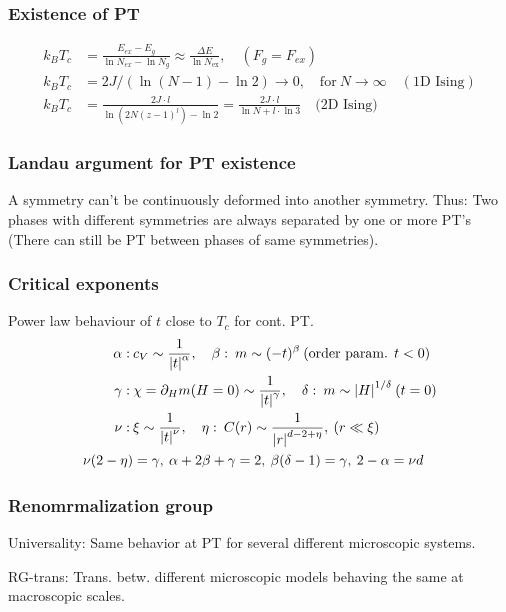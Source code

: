 \documentclass[a4paper, english, 12pt]{article}
\begin{document}
\begin{multicols*}{2}
\subsubsection*{\tiny Existence of PT} 

\begin{align*}
    k_B T_c &= \frac{E_{ex}-E_g}{\ln N_{ex}-\ln N_g} \approx \frac{\Delta E}{\ln N_\mathrm{ex}},\quad (F_g=F_{ex}) \\
    k_B T_c &= 2J/(\ln(N-1)-\ln 2) \to 0,\quad\text{for}\: N\to\infty\quad(\text{1D Ising}) \\
    k_B T_c &= \frac{2J\cdot l}{\ln(2N(z-1)^l)-\ln2} = \frac{2J \cdot l}{\ln N + l\cdot \ln3}\quad \text{(2D Ising)}
\end{align*} 


\subsubsection*{\tiny Landau argument for PT existence}
A symmetry can't be continuously deformed into another symmetry. Thus: Two phases with different symmetries are always separated by one or more PT's (There can still be PT between phases of same symmetries).


\subsubsection*{\scriptsize Critical exponents}
Power law behaviour of $t$ close to $T_c$ for cont. PT.
\begin{align*}
    \alpha:\: & c_V \sim \frac{1}{\abs{t}^\alpha},\quad \beta:\: m \sim (-t)^\beta\:(\text{order param. } t<0) \\ 
    \gamma:\:& \chi=\partial_H m(H=0) \sim \frac{1}{\abs{t}^\gamma},\quad \delta:\: m \sim \abs{H}^{1/\delta}\: (t=0) \\
    \nu:\: & \xi \sim \frac{1}{\abs{t}^\nu},\quad \eta:\: C(r) \sim \frac{1}{\abs{r}^{d-2+\eta}},\: (r\ll\xi) \\
    \nu(2-\eta) &= \gamma,\: \alpha + 2\beta + \gamma = 2,\: \beta(\delta-1) = \gamma,\: 2-\alpha = \nu d
\end{align*}


\subsubsection*{\scriptsize Renomrmalization group}
Universality: Same behavior at PT for several different microscopic systems. 

RG-trans: Trans. betw. different microscopic models behaving the same at macroscopic scales. 


\end{multicols*}
\end{document}
